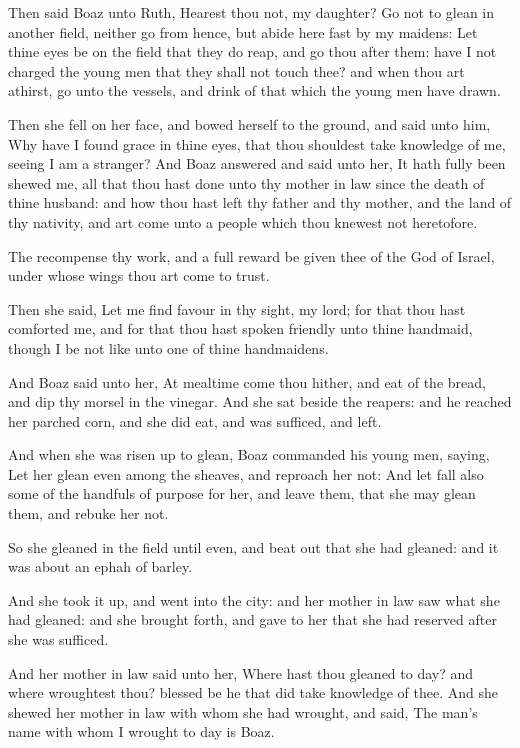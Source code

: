 \Verse Then said Boaz unto Ruth, Hearest thou not, my daughter? Go not to glean in another field, neither go from hence, but abide here fast by my maidens: \Verse Let thine eyes be on the field that they do reap, and go thou after them: have I not charged the young men that they shall not touch thee? and when thou art athirst, go unto the vessels, and drink of that which the young men have drawn.

\Verse Then she fell on her face, and bowed herself to the ground, and said unto him, Why have I found grace in thine eyes, that thou shouldest take knowledge of me, seeing I am a stranger?  \Verse And Boaz answered and said unto her, It hath fully been shewed me, all that thou hast done unto thy mother in law since the death of thine husband: and how thou hast left thy father and thy mother, and the land of thy nativity, and art come unto a people which thou knewest not heretofore.

\Verse The \LORD recompense thy work, and a full reward be given thee of the \LORD God of Israel, under whose wings thou art come to trust.

\Verse Then she said, Let me find favour in thy sight, my lord; for that thou hast comforted me, and for that thou hast spoken friendly unto thine handmaid, though I be not like unto one of thine handmaidens.

\Verse And Boaz said unto her, At mealtime come thou hither, and eat of the bread, and dip thy morsel in the vinegar. And she sat beside the reapers: and he reached her parched corn, and she did eat, and was sufficed, and left.

\Verse And when she was risen up to glean, Boaz commanded his young men, saying, Let her glean even among the sheaves, and reproach her not: \Verse And let fall also some of the handfuls of purpose for her, and leave them, that she may glean them, and rebuke her not.

\Verse So she gleaned in the field until even, and beat out that she had gleaned: and it was about an ephah of barley.

\Verse And she took it up, and went into the city: and her mother in law saw what she had gleaned: and she brought forth, and gave to her that she had reserved after she was sufficed.

\Verse And her mother in law said unto her, Where hast thou gleaned to day?  and where wroughtest thou? blessed be he that did take knowledge of thee. And she shewed her mother in law with whom she had wrought, and said, The man's name with whom I wrought to day is Boaz.


